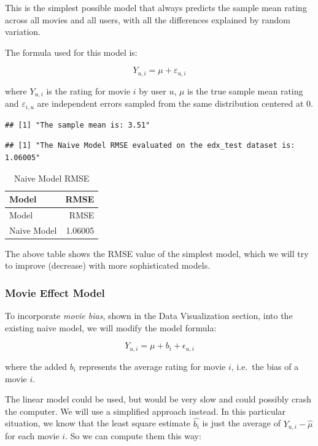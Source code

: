 \documentclass[
]{article}
\begin{document}
This is the simplest possible model that always predicts the sample mean
rating across all movies and all users, with all the differences
explained by random variation.

The formula used for this model is:

\[Y_{u,i} = \mu + \varepsilon_{u,i}\]

where \(Y_{u,i}\) is the rating for movie \(i\) by user \(u\), \(\mu\)
is the true sample mean rating and \(\varepsilon_{i,u}\) are independent
errors sampled from the same distribution centered at 0.

\begin{verbatim}
## [1] "The sample mean is: 3.51"
\end{verbatim}

\begin{verbatim}
## [1] "The Naive Model RMSE evaluated on the edx_test dataset is: 1.06005"
\end{verbatim}

\begin{longtable}[]{@{}lr@{}}
\caption{Naive Model RMSE}\tabularnewline
\toprule
Model & RMSE\tabularnewline
\midrule
\endfirsthead
\toprule
Model & RMSE\tabularnewline
\midrule
\endhead
Naive Model & 1.06005\tabularnewline
\bottomrule
\end{longtable}

The above table shows the RMSE value of the simplest model, which we
will try to improve (decrease) with more sophisticated models.

\hypertarget{movie-effect-model}{%
\subsubsection{Movie Effect Model}\label{movie-effect-model}}

To incorporate \emph{movie bias}, shown in the Data Visualization
section, into the existing naive model, we will modify the model
formula:

\[Y_{u,i} = \mu + b_i + \epsilon_{u,i}\]

where the added \(b_i\) represents the average rating for movie \(i\),
i.e.~the bias of a movie \(i\).

The linear model could be used, but would be very slow and could
possibly crash the computer. We will use a simplified approach instead.
In this particular situation, we know that the least square estimate
\(\hat{b_i}\) is just the average of \(Y_{u,i} - \hat{\mu}\) for each
movie \(i\). So we can compute them this way:
\end{document}
